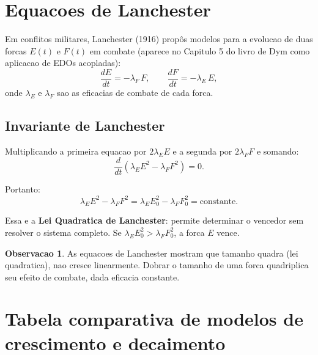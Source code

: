 \documentclass[12pt,a4paper,oneside]{book}
\theoremstyle{definition}
\newtheorem{remark}[definition]{Observacao}
\begin{document}
\section{Equacoes de Lanchester}

Em conflitos militares, Lanchester (1916) propôs modelos para a evolucao de duas forcas
$E(t)$ e $F(t)$ em combate (aparece no Capitulo 5 do livro de Dym como aplicacao de EDOs
acopladas):
\begin{equation}
\frac{dE}{dt} = -\lambda_F\,F, \qquad \frac{dF}{dt} = -\lambda_E\,E,
\end{equation}
onde $\lambda_E$ e $\lambda_F$ sao as eficacias de combate de cada forca.

\subsection{Invariante de Lanchester}

Multiplicando a primeira equacao por $2\lambda_E E$ e a segunda por $2\lambda_F F$ e somando:
\begin{equation}
\frac{d}{dt}\!\left(\lambda_E E^2 - \lambda_F F^2\right) = 0.
\end{equation}

Portanto:
\begin{equation}
\lambda_E E^2 - \lambda_F F^2 = \lambda_E E_0^2 - \lambda_F F_0^2 = \text{constante}.
\end{equation}

Essa e a \textbf{Lei Quadratica de Lanchester}: permite determinar o vencedor sem resolver
o sistema completo. Se $\lambda_E E_0^2 > \lambda_F F_0^2$, a forca $E$ vence.

\begin{remark}
As equacoes de Lanchester mostram que tamanho quadra (lei quadratica), nao cresce linearmente.
Dobrar o tamanho de uma forca quadriplica seu efeito de combate, dada eficacia constante.
\end{remark}

\section{Tabela comparativa de modelos de crescimento e decaimento}
\end{document}
